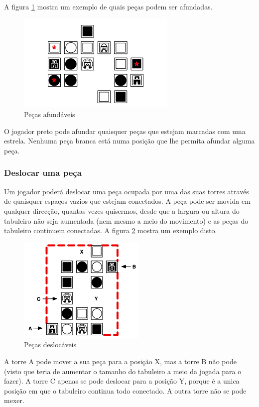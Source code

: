 \documentclass[a4paper]{article}
\begin{document}
A figura \ref{fig:sinktile} mostra um exemplo de quais peças podem ser afundadas.

\begin{figure}[h]
\centering
\includegraphics[scale=0.9]{sinktile.png}
\caption{Peças afundáveis}
\label{fig:sinktile}
\end{figure}


O jogador preto pode afundar quaisquer peças que estejam marcadas com uma estrela. Nenhuma peça branca está numa posição que lhe permita afundar alguma peça.

\subsubsection{Deslocar uma peça}

Um jogador poderá deslocar uma peça ocupada por uma das suas torres através de quaisquer espaços vazios que estejam conectados. A peça pode ser movida em qualquer direcção, quantas vezes quisermos, desde que a largura ou altura do tabuleiro não seja aumentada (nem mesmo a meio do movimento) e as peças do tabuleiro continuem conectadas. A figura \ref{fig:slidetile} mostra um exemplo disto.

\begin{figure}[h]
\centering
\includegraphics[scale=0.9]{slidetile.png}
\caption{Peças deslocáveis}
\label{fig:slidetile}
\end{figure}

A torre A pode mover a sua peça para a posição X, mas a torre B não pode (visto que teria de aumentar o tamanho do tabuleiro a meio da jogada para o fazer). A torre C apenas se pode deslocar para a posição Y, porque é a unica posição em que o tabuleiro continua todo conectado. A outra torre não se pode mexer.
\end{document}
